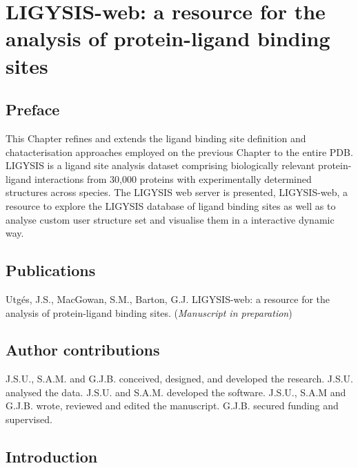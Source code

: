 \chapter{LIGYSIS-web: a resource for the analysis of protein-ligand binding sites}
\label{chap:LIGYSIS_WEB}

\section*{Preface}

This Chapter refines and extends the ligand binding site definition and chatacterisation approaches employed on the previous Chapter to the entire PDB. LIGYSIS is a ligand site analysis dataset comprising biologically relevant protein-ligand interactions from 30,000 proteins with experimentally determined structures across species. The LIGYSIS web server is presented, LIGYSIS-web, a resource to explore the LIGYSIS database of ligand binding sites as well as to analyse custom user structure set and visualise them in a interactive dynamic way.

\section*{Publications}

Utgés, J.S., MacGowan, S.M., Barton, G.J. LIGYSIS-web: a resource for the analysis of protein-ligand binding sites. (\textit{Manuscript in preparation})

\section*{Author contributions}

J.S.U., S.A.M. and G.J.B. conceived, designed, and developed the research. J.S.U. analysed the data. J.S.U. and S.A.M. developed the software. J.S.U., S.A.M and G.J.B. wrote, reviewed and edited the manuscript. G.J.B. secured funding and supervised.

\section{Introduction}

